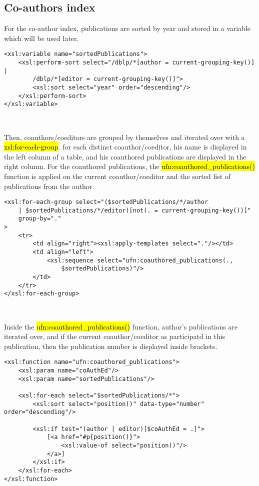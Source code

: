 \subsection{Co-authors index}
For the co-author index, publications are sorted by year and stored in a
variable which will be used later.\\

\begin{lstlisting}
<xsl:variable name="sortedPublications">
    <xsl:perform-sort select="/dblp/*[author = current-grouping-key()] |
        /dblp/*[editor = current-grouping-key()]">
        <xsl:sort select="year" order="descending"/>
    </xsl:perform-sort>
</xsl:variable>
\end{lstlisting}
\

Then, coauthors/coeditors are grouped by themselves and iterated over with a
\hl{xsl:for-each-group}. for each distinct coauthor/coeditor, his name is
displayed in the left column of a table, and his coauthored publications
are displayed in the right column. For the coauthored publications, the
\hl{ufn:coauthored\_publications()} function is applied on the current
coauthor/coeditor and the sorted list of publications from the author.\\

\begin{lstlisting}
<xsl:for-each-group select="($sortedPublications/*/author
    | $sortedPublications/*/editor)[not(. = current-grouping-key())]"
    group-by="."
>
    <tr>
        <td align="right"><xsl:apply-templates select="."/></td>
        <td align="left">
            <xsl:sequence select="ufn:coauthored_publications(.,
                $sortedPublications)"/>
        </td>
    </tr>
</xsl:for-each-group>
\end{lstlisting}
\

Inside the \hl{ufn:coauthored\_publications()} function, author's publications
are iterated over, and if the current coauthor/coeditor as participatd in this
publication, then the publication number is displayed inside brackets.\\

\begin{lstlisting}
<xsl:function name="ufn:coauthored_publications">
    <xsl:param name="coAuthEd"/>
    <xsl:param name="sortedPublications"/>

    <xsl:for-each select="$sortedPublications/*">
        <xsl:sort select="position()" data-type="number" order="descending"/>

        <xsl:if test="(author | editor)[$coAuthEd = .]">
            [<a href="#p{position()}">
                <xsl:value-of select="position()"/>
            </a>]
        </xsl:if>
    </xsl:for-each>
</xsl:function>
\end{lstlisting}
\newpage
